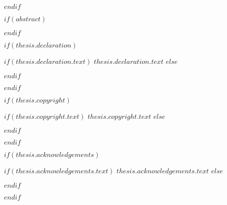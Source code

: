 $endif$

$if(abstract)$

\begin{abstract}
\addchaptertocentry{\abstractname} %
$abstract$
\end{abstract}

$endif$

$if(thesis.declaration)$
\begin{declaration}
\addchaptertocentry{\authorshipname} %
$if(thesis.declaration.text)$
$thesis.declaration.text$
$else$

$endif$

\end{declaration}

$endif$


$if(thesis.copyright)$
\begin{copyright}
\addchaptertocentry{\copyrightname} %
$if(thesis.copyright.text)$
$thesis.copyright.text$
$else$

$endif$

\end{copyright}

$endif$

$if(thesis.acknowledgements)$

\begin{acknowledgements}
\addchaptertocentry{\acknowledgementname} %
$if(thesis.acknowledgements.text)$
$thesis.acknowledgements.text$
$else$

$endif$
\end{acknowledgements}

$endif$

